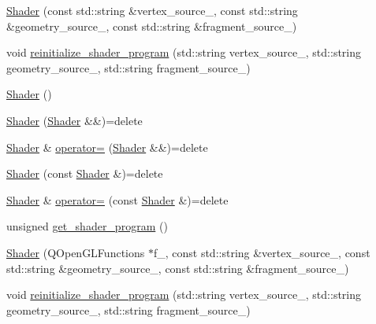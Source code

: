 \begin{DoxyCompactItemize}
\item 
\mbox{\hyperlink{classShader_3_01RENDER__TYPE_1_1CUSTOM_01_4_a8238c3e1a3a96e7ed2b1777a340d7947}{Shader}} (const std\+::string \&vertex\+\_\+source\+\_\+, const std\+::string \&geometry\+\_\+source\+\_\+, const std\+::string \&fragment\+\_\+source\+\_\+)
\item 
void \mbox{\hyperlink{classShader_3_01RENDER__TYPE_1_1CUSTOM_01_4_a7f861a0b2f176f627124ceeae7354e19}{reinitialize\+\_\+shader\+\_\+program}} (std\+::string vertex\+\_\+source\+\_\+, std\+::string geometry\+\_\+source\+\_\+, std\+::string fragment\+\_\+source\+\_\+)
\item 
\mbox{\hyperlink{classShader_3_01RENDER__TYPE_1_1CUSTOM_01_4_ad1c029ec4cba7e4557c7ce19ae9e006b}{Shader}} ()
\item 
\mbox{\hyperlink{classShader_3_01RENDER__TYPE_1_1CUSTOM_01_4_a4fea53201befd8962702645fe8f2526e}{Shader}} (\mbox{\hyperlink{classShader}{Shader}} \&\&)=delete
\item 
\mbox{\hyperlink{classShader}{Shader}} \& \mbox{\hyperlink{classShader_3_01RENDER__TYPE_1_1CUSTOM_01_4_a717f92caab16604933920257707046b6}{operator=}} (\mbox{\hyperlink{classShader}{Shader}} \&\&)=delete
\item 
\mbox{\hyperlink{classShader_3_01RENDER__TYPE_1_1CUSTOM_01_4_af1fbc8b0cb20d1af7905e2d896f0fb79}{Shader}} (const \mbox{\hyperlink{classShader}{Shader}} \&)=delete
\item 
\mbox{\hyperlink{classShader}{Shader}} \& \mbox{\hyperlink{classShader_3_01RENDER__TYPE_1_1CUSTOM_01_4_a44af437f5ea044824ba7937ee07d1da7}{operator=}} (const \mbox{\hyperlink{classShader}{Shader}} \&)=delete
\item 
unsigned \mbox{\hyperlink{classShader_3_01RENDER__TYPE_1_1CUSTOM_01_4_adf4d1f7a937d11102268dfb8fc7f2f9e}{get\+\_\+shader\+\_\+program}} ()
\item 
\mbox{\hyperlink{classShader_3_01RENDER__TYPE_1_1CUSTOM_01_4_a96f5985e060de5daa34e818aedfb7e23}{Shader}} (Q\+Open\+G\+L\+Functions $\ast$f\+\_\+, const std\+::string \&vertex\+\_\+source\+\_\+, const std\+::string \&geometry\+\_\+source\+\_\+, const std\+::string \&fragment\+\_\+source\+\_\+)
\item 
void \mbox{\hyperlink{classShader_3_01RENDER__TYPE_1_1CUSTOM_01_4_a7f861a0b2f176f627124ceeae7354e19}{reinitialize\+\_\+shader\+\_\+program}} (std\+::string vertex\+\_\+source\+\_\+, std\+::string geometry\+\_\+source\+\_\+, std\+::string fragment\+\_\+source\+\_\+)
\item 

\end{DoxyCompactItemize}
